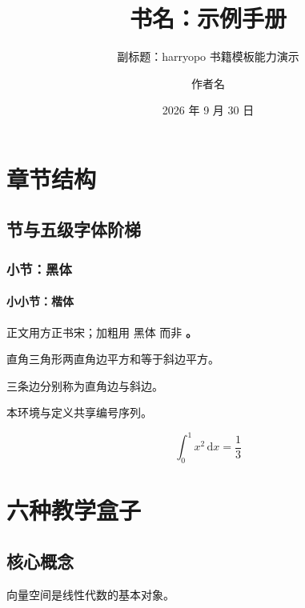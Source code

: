 \documentclass{harryopo-book}
\title{书名：示例手册}
\subtitle{副标题：harryopo 书籍模板能力演示}
\author{作者名}
\institute{机构名}
\date{2026 年 9 月 30 日}
\begin{document}
\frontmatter
\maketitle
\tableofcontents

\mainmatter


\chapter{章节结构}
\section{节与五级字体阶梯}
\subsection{小节：黑体}
\subsubsection{小小节：楷体}
正文用方正书宋；加粗用 {\fzht 黑体} 而非 \textbf。


\begin{theorem}[勾股定理]
直角三角形两直角边平方和等于斜边平方。
\end{theorem}
\begin{definition}
三条边分别称为直角边与斜边。
\end{definition}
\begin{remark}
本环境与定义共享编号序列。
\end{remark}

\begin{equation}
  \int_0^1 x^2 \,\mathrm{d}x = \frac{1}{3}
\end{equation}

\chapter{六种教学盒子}
\section{核心概念}
\begin{keyconcept}
向量空间是线性代数的基本对象。
\end{keyconcept}
\end{document}
